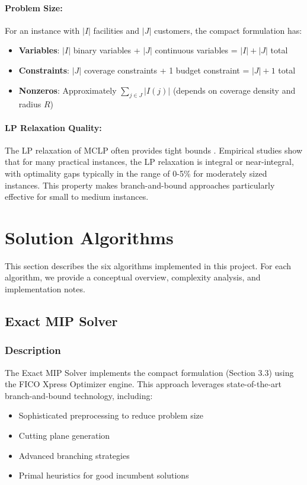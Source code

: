 \documentclass[11pt,a4paper]{article}
\begin{document}
\paragraph{Problem Size:}
For an instance with $|I|$ facilities and $|J|$ customers, the compact formulation has:
\begin{itemize}
  \item \textbf{Variables}: $|I|$ binary variables + $|J|$ continuous variables = $|I| + |J|$ total
  \item \textbf{Constraints}: $|J|$ coverage constraints + 1 budget constraint = $|J| + 1$ total
  \item \textbf{Nonzeros}: Approximately $\sum_{j \in J} |I(j)|$ (depends on coverage density and radius $R$)
\end{itemize}

\paragraph{LP Relaxation Quality:}
The LP relaxation of MCLP often provides tight bounds \cite{church1974,snyder2011}. Empirical studies show that for many practical instances, the LP relaxation is integral or near-integral, with optimality gaps typically in the range of 0-5\% for moderately sized instances. This property makes branch-and-bound approaches particularly effective for small to medium instances.

\newpage
\section{Solution Algorithms}

This section describes the six algorithms implemented in this project. For each algorithm, we provide a conceptual overview, complexity analysis, and implementation notes.

\subsection{Exact MIP Solver}

\subsubsection{Description}

The Exact MIP Solver implements the compact formulation (Section 3.3) using the FICO Xpress Optimizer engine. This approach leverages state-of-the-art branch-and-bound technology, including:
\begin{itemize}
  \item Sophisticated preprocessing to reduce problem size
  \item Cutting plane generation
  \item Advanced branching strategies
  \item Primal heuristics for good incumbent solutions
\end{itemize}
\end{document}
